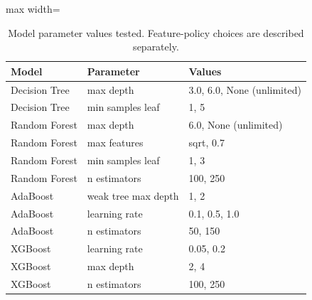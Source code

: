 \begin{table}[H]
\centering\small
\caption{Model parameter values tested. Feature-policy choices are described separately.}
\begin{adjustbox}{max width=\linewidth}\begin{tabular}{lll}
\toprule
Model & Parameter & Values \\
\midrule
Decision Tree & max depth & 3.0, 6.0, None (unlimited) \\
Decision Tree & min samples leaf & 1, 5 \\
Random Forest & max depth & 6.0, None (unlimited) \\
Random Forest & max features & sqrt, 0.7 \\
Random Forest & min samples leaf & 1, 3 \\
Random Forest & n estimators & 100, 250 \\
AdaBoost & weak tree max depth & 1, 2 \\
AdaBoost & learning rate & 0.1, 0.5, 1.0 \\
AdaBoost & n estimators & 50, 150 \\
XGBoost & learning rate & 0.05, 0.2 \\
XGBoost & max depth & 2, 4 \\
XGBoost & n estimators & 100, 250 \\
\bottomrule
\end{tabular}\end{adjustbox}
\end{table}
